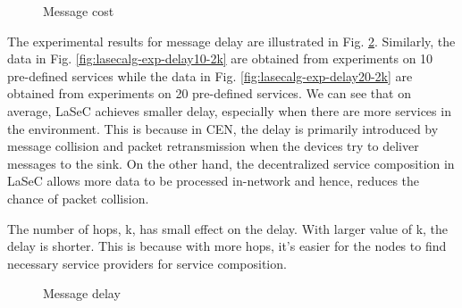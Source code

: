 \begin{figure}
\centering
{}
\caption{Message cost}
\label{fig:lasecalg-exp-cost}
\end{figure}

The experimental results for message delay are illustrated in Fig. \ref{fig:lasecalg-exp-delay}. Similarly, the data in Fig. \ref{fig:lasecalg-exp-delay10-2k} are obtained from experiments on 10 pre-defined services while the data in Fig. \ref{fig:lasecalg-exp-delay20-2k} are obtained from experiments on 20 pre-defined services.  We can see that on average, LaSeC achieves smaller delay, especially when there are more services in the environment. This is because in CEN, the delay is primarily introduced by message collision and packet retransmission when the devices try to deliver messages to the sink. On the other hand, the decentralized service composition in LaSeC allows more data to be processed in-network and hence, reduces the chance of packet collision.

The number of hops, k, has small effect on the delay. With larger value of k, the delay is shorter. This is because with more hops, it's easier for the nodes to find necessary service providers for service composition.

\begin{figure}
\centering
{}
\caption{Message delay}
\label{fig:lasecalg-exp-delay}
\end{figure}
